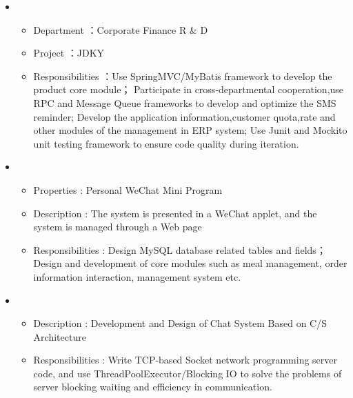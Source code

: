   \begin{itemize}[leftmargin=*]
    \item 
        {\small
      \begin{itemize}
        \item Department ：Corporate Finance R \& D
        \item Project ：JDKY
        \item Responsibilities ：Use SpringMVC/MyBatis framework to develop the product core module；
                      Participate in cross-departmental cooperation,use RPC and Message Queue frameworks to develop and optimize the SMS reminder;
                      Develop the application information,customer quota,rate and other modules of the management in ERP system;
                      Use Junit and Mockito unit testing framework to ensure code quality during iteration.

      \end{itemize}
      }

    \item
      {\small
      \begin{itemize}
        \item Properties : Personal WeChat Mini Program
        \item Description : The system is presented in a WeChat applet, and the system is managed through a Web page
        \item Responsibilities : Design MySQL database related tables and fields；
        Design and development of core modules such as meal management, order information interaction, management system etc.
      \end{itemize}
      }
    \item
      {\small
      \begin{itemize}
        \item Description : Development and Design of Chat System Based on C/S Architecture
        \item Responsibilities : Write TCP-based Socket network programming server code, and use ThreadPoolExecutor/Blocking IO to solve the problems of server blocking waiting and efficiency in communication.
      \end{itemize}
      }

  \end{itemize}